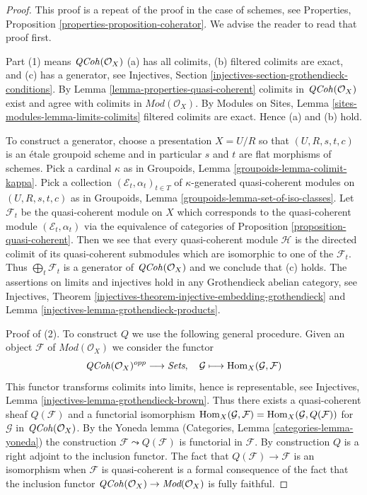 \begin{proof}
This proof is a repeat of the proof in the case of schemes, see
Properties, Proposition \ref{properties-proposition-coherator}.
We advise the reader to read that proof first.

\medskip\noindent
Part (1) means $\mathit{QCoh}(\mathcal{O}_X)$ (a) has all colimits,
(b) filtered colimits are exact, and (c) has a generator, see
Injectives, Section \ref{injectives-section-grothendieck-conditions}.
By Lemma \ref{lemma-properties-quasi-coherent}
colimits in $\mathit{QCoh}(\mathcal{O}_X)$ exist and agree
with colimits in $\textit{Mod}(\mathcal{O}_X)$. By
Modules on Sites, Lemma \ref{sites-modules-lemma-limits-colimits}
filtered colimits are exact. Hence (a) and (b) hold.

\medskip\noindent
To construct a generator, choose a presentation $X = U/R$ so that
$(U, R, s, t, c)$ is an
\'etale groupoid scheme and in particular $s$ and $t$ are flat morphisms
of schemes. Pick a cardinal $\kappa$ as in
Groupoids, Lemma \ref{groupoids-lemma-colimit-kappa}.
Pick a collection $(\mathcal{E}_t, \alpha_t)_{t \in T}$ of
$\kappa$-generated quasi-coherent modules on
$(U, R, s, t, c)$ as in
Groupoids, Lemma \ref{groupoids-lemma-set-of-iso-classes}.
Let $\mathcal{F}_t$ be the quasi-coherent module on $X$ which
corresponds to the quasi-coherent module $(\mathcal{E}_t, \alpha_t)$ via
the equivalence of categories of
Proposition \ref{proposition-quasi-coherent}.
Then we see that every quasi-coherent module $\mathcal{H}$ is the
directed colimit of its quasi-coherent submodules which are isomorphic
to one of the $\mathcal{F}_t$. Thus $\bigoplus_t \mathcal{F}_t$ is
a generator of $\mathit{QCoh}(\mathcal{O}_X)$ and we conclude that (c) holds.
The assertions on limits and injectives hold in any
Grothendieck abelian category, see
Injectives, Theorem
\ref{injectives-theorem-injective-embedding-grothendieck} and
Lemma \ref{injectives-lemma-grothendieck-products}.

\medskip\noindent
Proof of (2). To construct $Q$ we use the following general procedure.
Given an object $\mathcal{F}$ of $\textit{Mod}(\mathcal{O}_X)$
we consider the functor
$$
\mathit{QCoh}(\mathcal{O}_X)^{opp} \longrightarrow \textit{Sets},\quad
\mathcal{G} \longmapsto \mathop{\mathrm{Hom}}\nolimits_X(\mathcal{G}, \mathcal{F})
$$
This functor transforms colimits into limits,
hence is representable, see
Injectives, Lemma \ref{injectives-lemma-grothendieck-brown}.
Thus there exists a quasi-coherent sheaf $Q(\mathcal{F})$
and a functorial isomorphism
$\mathop{\mathrm{Hom}}\nolimits_X(\mathcal{G}, \mathcal{F}) = \mathop{\mathrm{Hom}}\nolimits_X(\mathcal{G}, Q(\mathcal{F}))$
for $\mathcal{G}$ in $\mathit{QCoh}(\mathcal{O}_X)$. By the Yoneda lemma
(Categories, Lemma \ref{categories-lemma-yoneda})
the construction $\mathcal{F} \leadsto Q(\mathcal{F})$ is
functorial in $\mathcal{F}$. By construction $Q$ is a right
adjoint to the inclusion functor.
The fact that $Q(\mathcal{F}) \to \mathcal{F}$ is an isomorphism
when $\mathcal{F}$ is quasi-coherent is a formal consequence of the fact
that the inclusion functor
$\mathit{QCoh}(\mathcal{O}_X) \to \textit{Mod}(\mathcal{O}_X)$
is fully faithful.
\end{proof}






